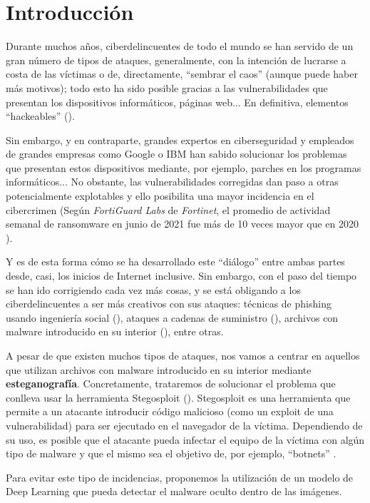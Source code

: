 \chapter{Introducción}
\label{ch:intro}

Durante muchos años, ciberdelincuentes de todo el mundo se han servido de un gran número de tipos de ataques, generalmente, con la intención de lucrarse a costa de las víctimas o de, directamente, ``sembrar el caos'' (aunque puede haber más motivos); todo esto ha sido posible gracias a las vulnerabilidades que presentan los dispositivos informáticos, páginas web... En definitiva, elementos ``hackeables'' (\cite{historia-ciber}).%

Sin embargo, y en contraparte, grandes expertos en ciberseguridad y empleados de grandes empresas como Google o IBM han sabido solucionar los problemas que presentan estos dispositivos mediante, por ejemplo, parches en los programas informáticos... No obstante, las vulnerabilidades corregidas dan paso a otras potencialmente explotables y ello posibilita una mayor incidencia en el cibercrimen (Según \textit{FortiGuard Labs} de \textit{Fortinet}, el promedio de actividad semanal de ransomware en junio de 2021 fue más de 10 veces mayor que en 2020 \cite{guerra-ciber}).%

Y es de esta forma cómo se ha desarrollado este ``diálogo'' entre ambas partes desde, casi, los inicios de Internet inclusive. Sin embargo, con el paso del tiempo se han ido corrigiendo cada vez más cosas, y se está obligando a los ciberdelincuentes a ser más creativos con sus ataques: técnicas de phishing usando ingeniería social (\cite{phishing}), ataques a cadenas de suministro (\cite{cadena-suministro}), archivos con malware introducido en su interior (\cite{malware-imagen}), entre otras. %

A pesar de que existen muchos tipos de ataques, nos vamos a centrar en aquellos que utilizan archivos con malware introducido en su interior mediante \textbf{esteganografía}. Concretamente, trataremos de solucionar el problema que conlleva usar la herramienta Stegosploit (\cite{stegosploit}). Stegosploit es una herramienta que permite a un atacante introducir código malicioso (como un exploit de una vulnerabilidad) para ser ejecutado en el navegador de la víctima. Dependiendo de su uso, es posible que el atacante pueda infectar el equipo de la víctima con algún tipo de malware y que el mismo sea el objetivo de, por ejemplo, ``botnets'' \cite{botnet}.

Para evitar este tipo de incidencias, proponemos la utilización de un modelo de Deep Learning que pueda detectar el malware oculto dentro de las imágenes.

